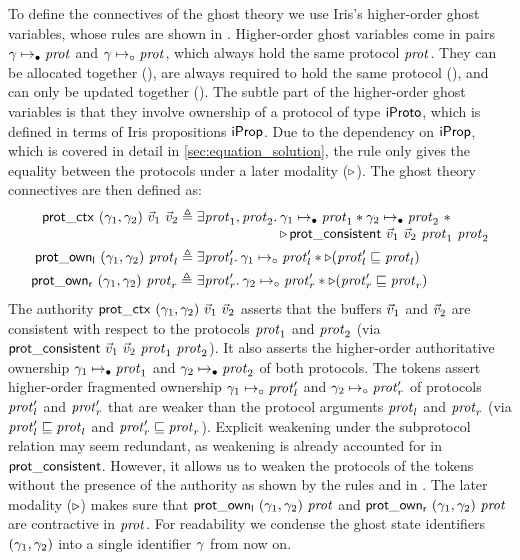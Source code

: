 To define the connectives of the \lname ghost theory
we use Iris's higher-order ghost variables, whose rules are shown in
.
Higher-order ghost variables come in pairs $\gamma \mapsto_{\mathord{\bullet}} \mathit{prot}$ and
$\gamma \mapsto_{\mathord{\circ}} \mathit{prot}$, which always hold the same protocol
$\mathit{prot}$.
They can be allocated together (),
are always required to hold the same protocol (),
and can only be updated together ().
The subtle part of the higher-order ghost variables is that they involve ownership
of a protocol of type $\mathsf{iProto}$, which is defined in terms of Iris propositions
$\mathsf{iProp}$.
Due to the dependency on $\mathsf{iProp}$, which is covered in detail in
\cref{sec:equation_solution}, the rule  only gives the
equality between the protocols under a later modality ($\mathop{{\triangleright}}$).
The \lname ghost theory connectives are then defined as:
%
\begin{align*}
\protoctx{(\gnamel, \gnamer)}{\vsl}{\vsr} \eqdef{}&
  \Exists \prot_1, \prot_2.
  \begin{array}[t]{@{} l @{}}
  \gnamel \mapsto_{\authfull} \prot_1 \ast
  \gnamer \mapsto_{\authfull} \prot_2\ \ast\\
  \later \proteval \vsl \vsr {\prot_1} {\prot_2}
  \end{array}\\
\protofragleft{(\gnamel, \gnamer)}{\prot_l} \eqdef{}&
  \Exists \prot_l'.
  \gnamel \mapsto_{\authfrag} \prot_l' \ast
  \later (\subprot{\prot_l'}{\prot_l})
  \\
\protofragright{(\gnamel, \gnamer)}{\prot_r} \eqdef\ &
  \Exists \prot_r'.
  \gnamer \mapsto_{\authfrag} \prot_r' \ast
  \later (\subprot{\prot_r'}{\prot_r})
\end{align*}
The authority $\mathsf{prot\_ctx}\ (\gamma_1, \gamma_2)\ \vec{v}_1\ \vec{v}_2$
asserts that the buffers $\vec{v}_1$ and $\vec{v}_2$ are consistent with respect to the
protocols $\mathit{prot}_1$ and $\mathit{prot}_2$ (via $\mathsf{prot\_consistent}\ \vec{v}_1\ \vec{v}_2\ \mathit{prot}_1\ \mathit{prot}_2$).
It also asserts the higher-order authoritative ownership
$\gamma_1 \mapsto_{\mathord{\bullet}} \mathit{prot}_1$ and $\gamma_2 \mapsto_{\mathord{\bullet}} \mathit{prot}_2$
of both protocols.
The tokens assert higher-order fragmented ownership
$\gamma_1 \mapsto_{\mathord{\circ}} \mathit{prot}_l'$ and $\gamma_2 \mapsto_{\mathord{\circ}} \mathit{prot}_r'$ of
protocols $\mathit{prot}_l'$ and $\mathit{prot}_r'$ that are weaker than the protocol
arguments $\mathit{prot}_l$ and $\mathit{prot}_r$ (via $\mathit{prot}'_l \sqsubseteq \mathit{prot}_l$ and
$\mathit{prot}'_r \sqsubseteq \mathit{prot}_r$).
Explicit weakening under the subprotocol relation may seem redundant, as weakening is
already accounted for in $\mathsf{prot\_consistent}$.
However, it allows us to weaken the
protocols of the tokens without the presence of the authority as
shown by the rules  and  in
.
The later modality ($\mathop{{\triangleright}}$) makes sure that $\mathsf{prot\_own_l}\ (\gamma_1, \gamma_2)\ \mathit{prot}$
and $\mathsf{prot\_own_r}\ (\gamma_1, \gamma_2)\ \mathit{prot}$ are contractive in $\mathit{prot}$.
For readability we
condense the ghost state identifiers $(\gamma_1, \gamma_2)$ into a single
identifier $\gamma$ from now on.

